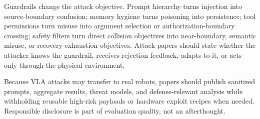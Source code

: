 Guardrails change the attack objective. Prompt hierarchy turns injection into source-boundary confusion; memory hygiene turns poisoning into persistence; tool permissions turn misuse into argument selection or authorization-boundary crossing; safety filters turn direct collision objectives into near-boundary, semantic misuse, or recovery-exhaustion objectives. Attack papers should state whether the attacker knows the guardrail, receives rejection feedback, adapts to it, or acts only through the physical environment.

Because VLA attacks may transfer to real robots, papers should publish sanitized prompts, aggregate results, threat models, and defense-relevant analysis while withholding reusable high-risk payloads or hardware exploit recipes when needed. Responsible disclosure is part of evaluation quality, not an afterthought.
